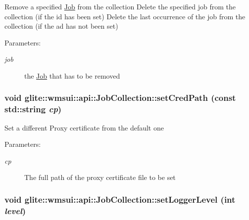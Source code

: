 Remove a specified \hyperlink{classglite_1_1wmsui_1_1api_1_1Job}{Job} from the collection Delete the specified job from the collection (if the id has been set) Delete the last occurrence of the job from the collection (if the ad has not been set) \begin{Desc}
\item[Parameters:]
\begin{description}
\item[{\em job}]the \hyperlink{classglite_1_1wmsui_1_1api_1_1Job}{Job} that has to be removed \end{description}
\end{Desc}
\hypertarget{classglite_1_1wmsui_1_1api_1_1JobCollection_z3_6}{
\subsubsection[setCredPath]{\setlength{\rightskip}{0pt plus 5cm}void glite::wmsui::api::Job\-Collection::set\-Cred\-Path (const std::string {\em cp})}}
\label{classglite_1_1wmsui_1_1api_1_1JobCollection_z3_6}


Set a different Proxy certificate from the default one \begin{Desc}
\item[Parameters:]
\begin{description}
\item[{\em cp}]The full path of the proxy certificate file to be set \end{description}
\end{Desc}
\hypertarget{classglite_1_1wmsui_1_1api_1_1JobCollection_z3_5}{
\subsubsection[setLoggerLevel]{\setlength{\rightskip}{0pt plus 5cm}void glite::wmsui::api::Job\-Collection::set\-Logger\-Level (int {\em level})}}
\label{classglite_1_1wmsui_1_1api_1_1JobCollection_z3_5}


